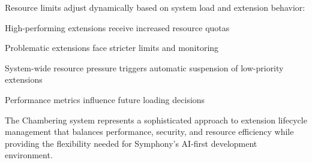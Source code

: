 Resource limits adjust dynamically based on system load and extension behavior:

\begin{compactlist}
\item High-performing extensions receive increased resource quotas
\item Problematic extensions face stricter limits and monitoring
\item System-wide resource pressure triggers automatic suspension of low-priority extensions
\item Performance metrics influence future loading decisions
\end{compactlist}

The Chambering system represents a sophisticated approach to extension lifecycle management that balances performance, security, and resource efficiency while providing the flexibility needed for Symphony's AI-first development environment.